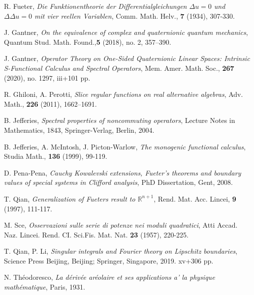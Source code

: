 \documentclass[reqno,11pt]{amsart}
\numberwithin{equation}{section}
\theoremstyle{definition}
\begin{document}
\begin{thebibliography}{99}
 R. Fueter, \emph{Die Funktionentheorie der Differentialgleichungen $\Delta u = 0$ und $\Delta\Delta u = 0$ mit vier reellen Variablen},  Comm. Math. Helv., {\bf 7} (1934), 307-330.

J. Gantner, {\em On the equivalence of complex and quaternionic quantum mechanics},
 Quantum Stud. Math. Found.,{\bf 5} (2018), no. 2, 357--390.

 J. Gantner, {\em  Operator Theory on One-Sided Quaternionic Linear Spaces: Intrinsic S-Functional Calculus and Spectral Operators},
 Mem. Amer. Math. Soc., {\bf 267} (2020), no. 1297, iii+101 pp.

 R. Ghiloni, A. Perotti, {\em Slice regular functions on real alternative algebras}, Adv. Math., {\bf 226} (2011), 1662--1691.


 B. Jefferies, {\em Spectral properties of noncommuting operators}, Lecture Notes in Mathematics, 1843, Springer-Verlag, Berlin, 2004.

   B. Jefferies, A. McIntosh, J. Picton-Warlow,  {\em The monogenic functional calculus}, Studia Math., {\bf 136} (1999), 99-119.


 D. Pena-Pena, \emph{Cauchy Kowalevski extensions, Fueter's theorems and boundary values of special systems in Clifford analysis}, PhD Dissertation, Gent, 2008.

T. Qian, \emph{Generalization of Fueters result to $\mathbb{R}^{n+1}$}, Rend. Mat. Acc. Lincei, \textbf{9} (1997), 111-117.

 M. Sce, \emph{Osservazioni sulle serie di potenze nei moduli quadratici}, Atti Accad. Naz. Lincei. Rend. CI. Sci.Fis. Mat. Nat. \textbf{23} (1957), 220-225.

 T. Qian, P. Li, \emph{Singular integrals and Fourier theory on Lipschitz boundaries}, Science Press Beijing, Beijing; Springer, Singapore, 2019. xv+306 pp.

 N. Théodoresco, \emph{La dérivée aréolaire et ses applications a' la physique mathématique}, Paris, 1931.
\end{thebibliography}
\end{document}
